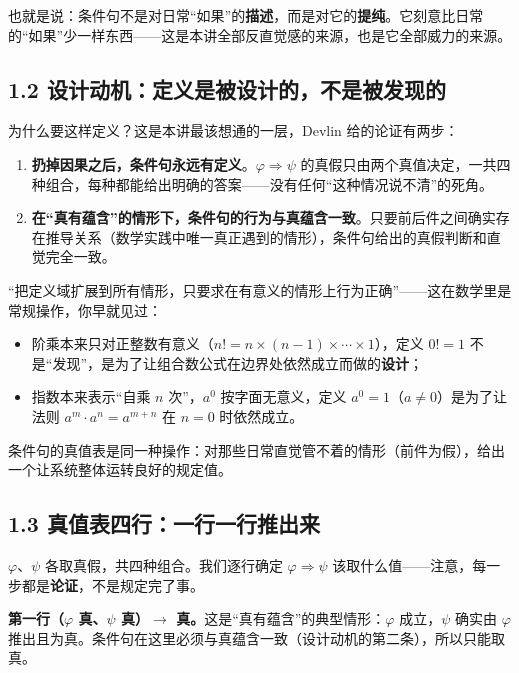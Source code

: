 \documentclass[UTF8,a4paper,11pt]{ctexart}
\begin{document}
也就是说：条件句不是对日常“如果”的\textbf{描述}，而是对它的\textbf{提纯}。它刻意比日常的“如果”少一样东西——这是本讲全部反直觉感的来源，也是它全部威力的来源。

\subsection*{1.2 设计动机：定义是被设计的，不是被发现的}

为什么要这样定义？这是本讲最该想通的一层，Devlin 给的论证有两步：

\begin{enumerate}
  \item \textbf{扔掉因果之后，条件句永远有定义}。$\varphi \Rightarrow \psi$ 的真假只由两个真值决定，一共四种组合，每种都能给出明确的答案——没有任何“这种情况说不清”的死角。
  \item \textbf{在“真有蕴含”的情形下，条件句的行为与真蕴含一致}。只要前后件之间确实存在推导关系（数学实践中唯一真正遇到的情形），条件句给出的真假判断和直觉完全一致。
\end{enumerate}

\begin{calcbox}[同一设计模式的两个老熟人：$0! = 1$ 与 $a^0 = 1$]
“把定义域扩展到所有情形，只要求在有意义的情形上行为正确”——这在数学里是常规操作，你早就见过：
\begin{itemize}
  \item 阶乘本来只对正整数有意义（$n! = n \times (n-1) \times \cdots \times 1$），定义 $0! = 1$ 不是“发现”，是为了让组合数公式在边界处依然成立而做的\textbf{设计}；
  \item 指数本来表示“自乘 $n$ 次”，$a^0$ 按字面无意义，定义 $a^0 = 1$（$a \neq 0$）是为了让法则 $a^m \cdot a^n = a^{m+n}$ 在 $n=0$ 时依然成立。
\end{itemize}
条件句的真值表是同一种操作：对那些日常直觉管不着的情形（前件为假），给出一个让系统整体运转良好的规定值。
\end{calcbox}

\subsection*{1.3 真值表四行：一行一行推出来}

$\varphi$、$\psi$ 各取真假，共四种组合。我们逐行确定 $\varphi \Rightarrow \psi$ 该取什么值——注意，每一步都是\textbf{论证}，不是规定完了事。

\textbf{第一行（$\varphi$ 真、$\psi$ 真）$\rightarrow$ 真。}这是“真有蕴含”的典型情形：$\varphi$ 成立，$\psi$ 确实由 $\varphi$ 推出且为真。条件句在这里必须与真蕴含一致（设计动机的第二条），所以只能取真。
\end{document}
